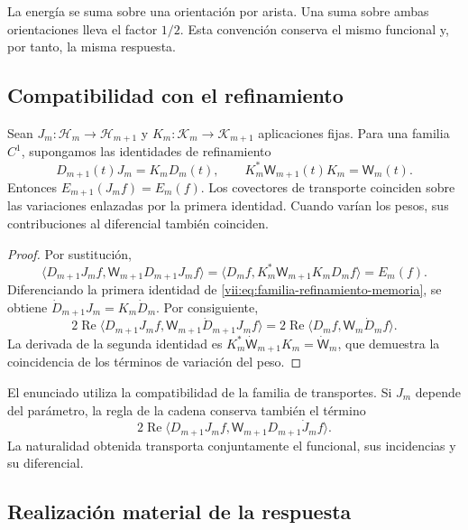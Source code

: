 La energía se suma sobre una orientación por arista. Una suma sobre ambas
orientaciones lleva el factor \(1/2\). Esta convención conserva el mismo
funcional y, por tanto, la misma respuesta.

\subsection{Compatibilidad con el refinamiento}
\label{vii:subsec:refinamiento-respuesta}

\begin{theorem}
\label{vii:thm:refinamiento-respuesta}
Sean \(J_m:\mathcal H_m\to\mathcal H_{m+1}\) y
\(K_m:\mathcal K_m\to\mathcal K_{m+1}\) aplicaciones fijas.
Para una familia \(C^1\), supongamos las identidades de refinamiento
\begin{equation}
 D_{m+1}(t)J_m=K_mD_m(t),\qquad
 K_m^*\mathsf W_{m+1}(t)K_m=\mathsf W_m(t).
 \label{vii:eq:familia-refinamiento-memoria}
\end{equation}
Entonces \(E_{m+1}(J_mf)=E_m(f)\).
Los covectores de transporte coinciden sobre las variaciones enlazadas
por la primera identidad. Cuando varían los pesos, sus contribuciones
al diferencial también coinciden.
\end{theorem}

\begin{proof}
Por sustitución,
\[
 \langle D_{m+1}J_mf,\mathsf W_{m+1}D_{m+1}J_mf\rangle
 =\langle D_mf,K_m^*\mathsf W_{m+1}K_mD_mf\rangle=E_m(f).
\]
Diferenciando la primera identidad de
\eqref{vii:eq:familia-refinamiento-memoria}, se obtiene
\(\dot D_{m+1}J_m=K_m\dot D_m\). Por consiguiente,
\[
 2\operatorname{Re}
 \langle D_{m+1}J_mf,\mathsf W_{m+1}\dot D_{m+1}J_mf\rangle
 =2\operatorname{Re}\langle D_mf,\mathsf W_m\dot D_mf\rangle.
\]
La derivada de la segunda identidad es
\(K_m^*\dot{\mathsf W}_{m+1}K_m=\dot{\mathsf W}_m\), que demuestra
la coincidencia de los términos de variación del peso.
\end{proof}

El enunciado utiliza la compatibilidad de la familia de transportes.
Si \(J_m\) depende del parámetro, la regla de la cadena conserva
también el término
\[
 2\operatorname{Re}
 \langle D_{m+1}J_mf,\mathsf W_{m+1}D_{m+1}\dot J_mf\rangle.
\]
La naturalidad obtenida transporta conjuntamente el funcional, sus
incidencias y su diferencial.

\subsection{Realización material de la respuesta}
\label{vii:subsec:realizacion-respuesta-discreta}

